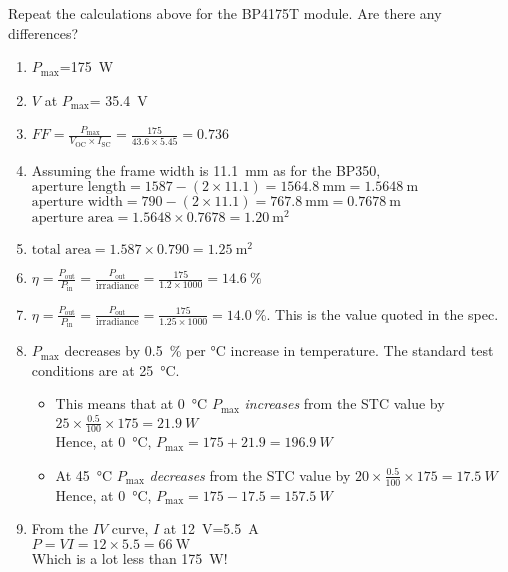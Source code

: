 \documentclass{article} %
\begin{document}
\begin{question}\label{qu:ex2}
Repeat the calculations above for the BP4175T module. Are there any differences?
\end{question}
\begin{solution}\label{sol:ex2}
    \begin{enumerate}[label=\alph*)]
    \item	$P_\text{max}$=\SI{175}{W}
    \item	$V$ at $P_\text{max}$= \SI{35.4}{V}
    \item	$FF=\frac{P_\text{max}}{V_\text{OC}\times I_\text{SC}}=\frac{175}{43.6\times 5.45}=0.736$
    \item Assuming the frame width is \SI{11.1}{\milli\metre} as for the BP350,\\$\text{aperture length}=1587-(2\times 11.1)=\SI{1564.8}{\milli\metre}=\SI{1.5648}{\metre}$\\
    $\text{aperture width}=790-(2\times 11.1)=\SI{767.8}{\milli\metre}=\SI{0.7678}{\metre}$\\
    $\text{aperture area}=1.5648\times 0.7678=\SI{1.20}{\metre\squared}$
    \item $\text{total area}=1.587\times 0.790=\SI{1.25}{\metre\squared}$
    \item $\eta=\frac{P_\text{out}}{P_\text{in}}=\frac{P_\text{out}}{\text{irradiance}}=\frac{175}{1.2\times 1000}=\SI{14.6}{\percent}$
    \item $\eta=\frac{P_\text{out}}{P_\text{in}}=\frac{P_\text{out}}{\text{irradiance}}=\frac{175}{1.25\times 1000}=\SI{14.0}{\percent}$. This is the value quoted in the spec.
    \item $P_\text{max}$ decreases by \SI{0.5}{\percent} per \si{\celsius} increase in temperature. The standard test conditions are at \SI{25}{\celsius}.
        \begin{itemize}
        \item	This means that at \SI{0}{\celsius } $P_\text{max}$ \emph{increases} from the STC value by $25\times \frac{0.5}{100}\times 175=\SI{21.9}{W}$\\
        Hence, at \SI{0}{\celsius}, $P_\text{max}=175+21.9=\SI{196.9}{W}$
        \item	At \SI{45}{\celsius } $P_\text{max}$ \emph{decreases} from the STC value by $20\times \frac{0.5}{100}\times 175=\SI{17.5}{W}$\\
        Hence, at \SI{0}{\celsius}, $P_\text{max}=175-17.5=\SI{157.5}{W}$
        \end{itemize}
\item From the $IV$ curve, $I$ at \SI{12}{V}=\SI{5.5}{\ampere}\\
$P=VI=12\times 5.5=\SI{66}{\watt}$\\
Which is a lot less than \SI{175}{\watt}!
\end{enumerate}
\end{solution}
\end{document}
